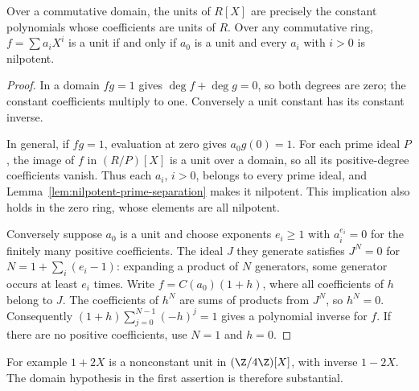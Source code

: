 \begin{proposition}\label{prop:polynomial-units}
Over a commutative domain, the units of $R[X]$ are precisely the
constant polynomials whose coefficients are units of $R$.
Over any commutative ring, $f=\sum a_iX^i$ is a unit if and only if
$a_0$ is a unit and every $a_i$ with $i>0$ is nilpotent.
\end{proposition}
\begin{proof}
In a domain $fg=1$ gives $\deg f+\deg g=0$, so both degrees are zero;
the constant coefficients multiply to one. Conversely a unit constant
has its constant inverse.

In general, if $fg=1$, evaluation at zero gives $a_0g(0)=1$.
For each prime ideal $P$, the image of $f$ in $(R/P)[X]$ is a unit
over a domain, so all its positive-degree coefficients vanish.
Thus each $a_i$, $i>0$, belongs to every prime ideal, and
Lemma~\ref{lem:nilpotent-prime-separation} makes it nilpotent.
This implication also holds in the zero ring, whose elements are
all nilpotent.

Conversely suppose $a_0$ is a unit and choose exponents
$e_i\ge1$ with $a_i^{e_i}=0$ for the finitely many positive
coefficients. The ideal $J$ they generate satisfies $J^N=0$ for
$N=1+\sum_i(e_i-1)$: expanding a product of $N$ generators,
some generator occurs at least $e_i$ times. Write
$f=C(a_0)(1+h)$, where all coefficients of $h$ belong to $J$.
The coefficients of $h^N$ are sums of products from $J^N$, so
$h^N=0$. Consequently
$(1+h)\sum_{j=0}^{N-1}(-h)^j=1$ gives a polynomial inverse for $f$.
If there are no positive coefficients, use $N=1$ and $h=0$.
\end{proof}
For example $1+2X$ is a nonconstant unit in $(\Z/4\Z)[X]$,
with inverse $1-2X$. The domain hypothesis in the first assertion
is therefore substantial.

